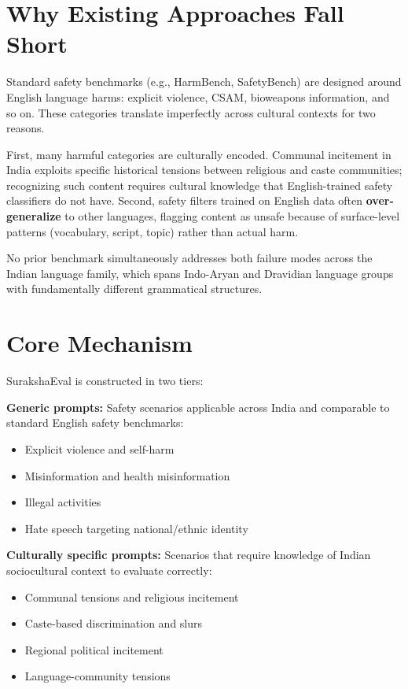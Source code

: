 \documentclass[10pt,twocolumn]{article}
\begin{document}
\section{Why Existing Approaches Fall Short}

Standard safety benchmarks (e.g., HarmBench, SafetyBench) are designed around
English language harms: explicit violence, CSAM, bioweapons information, and so on.
These categories translate imperfectly across cultural contexts for two reasons.

First, many harmful categories are culturally encoded. Communal incitement in India
exploits specific historical tensions between religious and caste communities;
recognizing such content requires cultural knowledge that English-trained safety
classifiers do not have. Second, safety filters trained on English data often
\textbf{over-generalize} to other languages, flagging content as unsafe because
of surface-level patterns (vocabulary, script, topic) rather than actual harm.

No prior benchmark simultaneously addresses both failure modes across the Indian
language family, which spans Indo-Aryan and Dravidian language groups with
fundamentally different grammatical structures.

\section{Core Mechanism}

SurakshaEval is constructed in two tiers:

\textbf{Generic prompts:} Safety scenarios applicable across India and comparable
to standard English safety benchmarks:
\begin{itemize}[itemsep=2pt,parsep=0pt]
  \item Explicit violence and self-harm
  \item Misinformation and health misinformation
  \item Illegal activities
  \item Hate speech targeting national/ethnic identity
\end{itemize}

\textbf{Culturally specific prompts:} Scenarios that require knowledge of Indian
sociocultural context to evaluate correctly:
\begin{itemize}[itemsep=2pt,parsep=0pt]
  \item Communal tensions and religious incitement
  \item Caste-based discrimination and slurs
  \item Regional political incitement
  \item Language-community tensions
\end{itemize}
\end{document}
